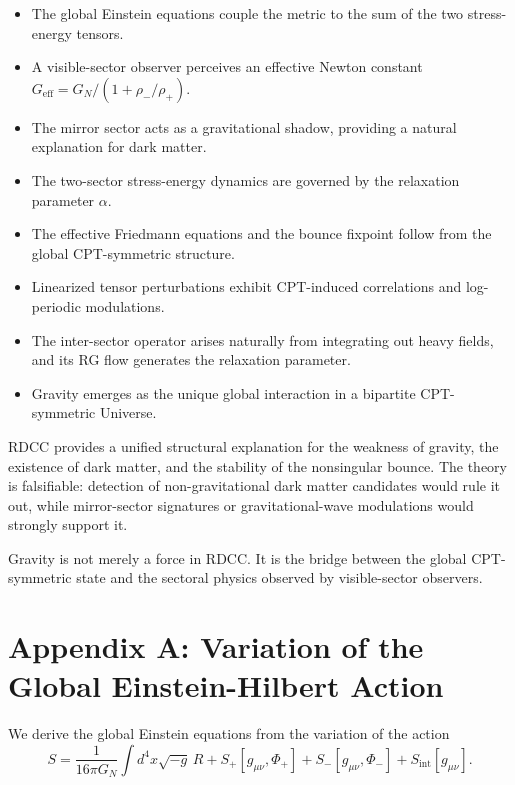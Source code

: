 \documentclass[11pt,a4paper]{article}
\begin{document}
\begin{itemize}
\item The global Einstein equations couple the metric to the sum of the two stress-energy tensors.
\item A visible-sector observer perceives an effective Newton constant $G_{\mathrm{eff}} = G_N / (1 + \rho_-/\rho_+)$.
\item The mirror sector acts as a gravitational shadow, providing a natural explanation for dark matter.
\item The two-sector stress-energy dynamics are governed by the relaxation parameter $\alpha$.
\item The effective Friedmann equations and the bounce fixpoint follow from the global CPT-symmetric structure.
\item Linearized tensor perturbations exhibit CPT-induced correlations and log-periodic modulations.
\item The inter-sector operator arises naturally from integrating out heavy fields, and its RG flow generates the relaxation parameter.
\item Gravity emerges as the unique global interaction in a bipartite CPT-symmetric Universe.
\end{itemize}

RDCC provides a unified structural explanation for the weakness of gravity, the existence of dark matter, and the stability of the nonsingular bounce. The theory is falsifiable: detection of non-gravitational dark matter candidates would rule it out, while mirror-sector signatures or gravitational-wave modulations would strongly support it.

Gravity is not merely a force in RDCC.  
It is the bridge between the global CPT-symmetric state and the sectoral physics observed by visible-sector observers.
\appendix
\section*{Appendix A: Variation of the Global Einstein-Hilbert Action}

We derive the global Einstein equations from the variation of the action
\begin{equation}
S = \frac{1}{16\pi G_N} \int d^4x \sqrt{-g} \, R 
+ S_+[g_{\mu\nu}, \Phi_+] 
+ S_-[g_{\mu\nu}, \Phi_-]
+ S_{\mathrm{int}}[g_{\mu\nu}].
\end{equation}
\end{document}
